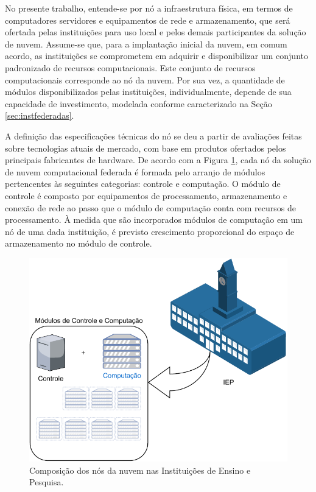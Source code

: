 \documentclass[tese,capa]{texufpel}
\begin{document}
No presente trabalho, entende-se por nó a infraestrutura física, em termos de computadores servidores e equipamentos de rede e armazenamento, que será ofertada pelas instituições para uso local e pelos demais participantes da solução de nuvem. Assume-se que, para a implantação inicial da nuvem, em comum acordo, as instituições se comprometem em adquirir e disponibilizar um conjunto padronizado de recursos computacionais. Este conjunto de recursos computacionais corresponde ao nó da nuvem. Por sua vez, a quantidade de módulos disponibilizados pelas instituições, individualmente, depende de sua capacidade de investimento, modelada conforme caracterizado na Seção \ref{sec:instfederadas}.

A definição das especificações técnicas do nó se deu a partir de avaliações feitas sobre tecnologias atuais de mercado, com base em produtos ofertados pelos principais fabricantes de hardware. De acordo com a Figura \ref{fig:IEPNosModulos}, cada nó da solução de nuvem computacional federada é formada pelo arranjo de módulos pertencentes às seguintes categorias: controle e computação. O módulo de controle é composto por equipamentos de processamento, armazenamento e conexão de rede ao passo que o módulo de computação conta com recursos de processamento. À medida que são incorporados módulos de computação em um nó de uma dada instituição, é previsto crescimento proporcional do espaço de armazenamento no módulo de controle.

\begin{figure}[H]
	\centering 
	\includegraphics[scale=.8]{images/IEPNosModulos-v2.drawio.pdf}
	\caption[Composição dos nós da nuvem nas Instituições de Ensino e Pesquisa.]{Composição dos nós da nuvem nas Instituições de Ensino e Pesquisa.} 
	\label{fig:IEPNosModulos}
\end{figure}
\end{document}
